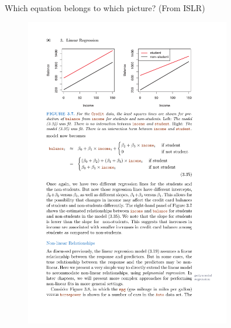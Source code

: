 \documentclass[aspectratio=169]{beamer}
\begin{document}
\begin{frame}{Which equation belongs to which picture? (From ISLR)}
\begin{figure}
\includegraphics[width=0.8\textwidth]{CreditExample}
\caption*{}
\end{figure}
\end{frame}
\end{document}
